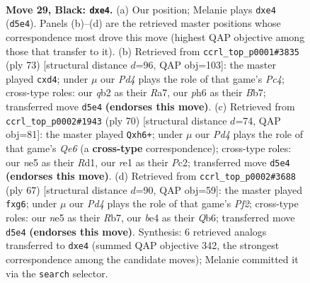 \documentclass[11pt]{article}
\begin{document}
\clearpage

\begin{figure}[p]\centering
\begin{subfigure}{0.46\textwidth}\centering
\resizebox{\linewidth}{!}{%
\newchessgame
\chessboard[
  setfen={r3b1k1/pr3pp1/7P/p2pN3/4B2q/PP6/1Q3P2/R3R1K1 b - - 0 29},
  showmover=false,
  pgfstyle=straightmove, color=movearrow, markmove={d5-e4}
]}
\caption{}
\end{subfigure}\hfill
\begin{subfigure}{0.46\textwidth}\centering
\resizebox{\linewidth}{!}{%
\newchessgame
\chessboard[
  setfen={r5k1/rb3pp1/7p/2pNp3/2PBP2q/7P/5PP1/1R1QR1K1 b - - 0 37},
  showmover=false,
  pgfstyle=straightmove, color=movearrow, markmove={c5-d4}
]}
\caption{}
\end{subfigure}
\\[4pt]
\begin{subfigure}{0.46\textwidth}\centering
\resizebox{\linewidth}{!}{%
\newchessgame
\chessboard[
  setfen={2r4r/2q4k/p1b1Q2p/1p2p1P1/1P1b1B2/P7/2P3RP/3R3K w - - 1 36},
  showmover=false,
  pgfstyle=straightmove, color=movearrow, markmove={e6-h6}
]}
\caption{}
\end{subfigure}\hfill
\begin{subfigure}{0.46\textwidth}\centering
\resizebox{\linewidth}{!}{%
\newchessgame
\chessboard[
  setfen={4r2k/1r3pp1/1qbpp1B1/8/3NPP1P/pP2Q1R1/8/K5R1 b - - 0 34},
  showmover=false,
  pgfstyle=straightmove, color=movearrow, markmove={f7-g6}
]}
\caption{}
\end{subfigure}
\caption{\textbf{Move 29, Black: \texttt{dxe4}.} (a) Our position; Melanie plays \texttt{dxe4} (\texttt{d5e4}). Panels (b)--(d) are the retrieved master positions whose correspondence most drove this move (highest QAP objective among those that transfer to it). (b) Retrieved from \texttt{ccrl\_top\_p0001\#3835} (ply 73) [structural distance $d$=96, QAP obj=103]: the master played \texttt{cxd4}; under $\mu$ our \emph{Pd4} plays the role of that game's \emph{Pc4}; cross-type roles: our \emph{q}b2 as their \emph{R}a7, our \emph{p}h6 as their \emph{B}b7; transferred move \texttt{d5e4} \textbf{(endorses this move)}. (c) Retrieved from \texttt{ccrl\_top\_p0002\#1943} (ply 70) [structural distance $d$=74, QAP obj=81]: the master played \texttt{Qxh6+}; under $\mu$ our \emph{Pd4} plays the role of that game's \emph{Qe6} (a \textbf{cross-type} correspondence); cross-type roles: our \emph{n}e5 as their \emph{R}d1, our \emph{r}e1 as their \emph{P}c2; transferred move \texttt{d5e4} \textbf{(endorses this move)}. (d) Retrieved from \texttt{ccrl\_top\_p0002\#3688} (ply 67) [structural distance $d$=90, QAP obj=59]: the master played \texttt{fxg6}; under $\mu$ our \emph{Pd4} plays the role of that game's \emph{Pf2}; cross-type roles: our \emph{n}e5 as their \emph{R}b7, our \emph{b}e4 as their \emph{Q}b6; transferred move \texttt{d5e4} \textbf{(endorses this move)}. Synthesis: 6 retrieved analogs transferred to \texttt{dxe4} (summed QAP objective 342, the strongest correspondence among the candidate moves); Melanie committed it via the \texttt{search} selector.}
\label{fig:thought-m57}
\end{figure}
\end{document}
